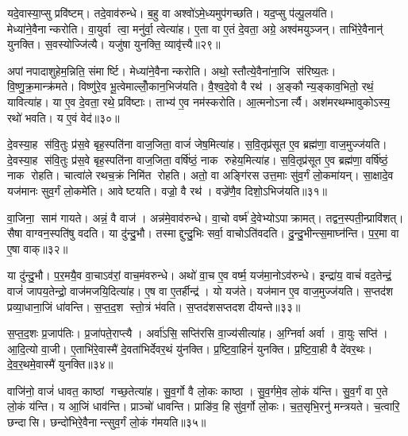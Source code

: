 यदे॒वास्या॒प्सु प्रवि॑ष्टम्। तदे॒वाव॑रुन्धे। ब॒हु वा अश्वो॑ऽमे॒ध्यमुप॑गच्छति। यद॒प्सु प॑ल्पू॒लय॑ति। मेध्या॑ने॒वै\-नान्करोति। वा॒युर्वा त्वा॒ मनु॑र्वा॒ त्वेत्या॑ह। ए॒ता वा ए॒तं दे॒वता॒ अग्रे॒ अश्व॑मयुञ्जन्। ताभि॑रे॒वैनान्॑ युनक्ति। स॒वस्योज्जि॑त्यै। यजु॑षा युनक्ति॒ व्यावृ॑त्त्यै॥२९॥

अपांनपादाशुहेम॒न्निति॒ संमार्ष्टि। मेध्या॑ने॒वैनान्करोति। अथो॒ स्तौत्ये॒वैना॑ना॒जि स॑रिष्य॒तः। वि॒ष्णु॒क्र॒मान्क्र॑मते। विष्णु॑रे॒व भू॒त्वेमाल्लोँ॒कान॒भिज॑यति। वै॒श्व॒दे॒वो वै रथ॑। अ॒ङ्कौ न्य॒ङ्काव॒भितो॒ रथं॒ यावित्या॑ह। या ए॒व दे॒वता॒ रथे॒ प्रवि॑ष्टाः। ताभ्य॑ ए॒व नम॑स्करोति। आ॒त्मनोऽनार्त्यै। अश॑मरथम्भावुकोऽस्य॒ रथो॑ भवति। य ए॒वं वेद॑॥३०॥\anuvakamend[स्व॒द॒य॒ति॒ प॒ल्पू॒लय॑ति॒ व्यावृ॑त्त्या॒ अनार्त्यै॒ द्वे च॑]

दे॒वस्या॒ह स॑वि॒तुः प्र॑स॒वे बृह॒स्पति॑ना वाज॒जिता॒ वाजं॑ जेष॒मित्या॑ह। स॒वि॒तृप्र॑सूत ए॒व ब्रह्म॑णा॒ वाज॒मुज्ज॑यति। दे॒वस्या॒ह स॑वि॒तुः प्र॑स॒वे बृह॒स्पति॑ना वाज॒जिता॒ वर्\mbox{}षि॑ष्ठं॒ नाक रुहेय॒मित्या॑ह। स॒वि॒तृप्र॑सूत ए॒व ब्रह्म॑णा॒ वर्\mbox{}षि॑ष्ठं॒ नाक रोहति। चात्वा॑ले रथच॒क्रं निमि॑त रोहति। अतो॒ वा अङ्गि॑रस उत्त॒माः सु॑व॒र्गं लो॒कमा॑यन्। सा॒क्षादे॒व यज॑मानः सुव॒र्गं लो॒कमे॑ति। आवेष्टयति। वज्रो॒ वै रथ॑। वज्रे॑णै॒व दिशो॒ऽभिज॑यति॥३१॥

वा॒जिना॒ साम॑ गायते। अन्नं॒ वै वाज॑। अन्न॑मे॒वाव॑रुन्धे। वा॒चो वर्ष्म॑ दे॒वेभ्योऽपाक्रामत्। तद्वन॒स्पती॒न्प्रावि॑शत्। सैषा वाग्वन॒स्पति॑षु वदति। या दु॑न्दु॒भौ। तस्माद्दुन्दु॒भिः सर्वा॒ वाचोऽति॑वदति। दु॒न्दु॒भीन्त्स॒माघ्न॑न्ति। प॒र॒मा वा ए॒षा वाक्॥३२॥

या दु॑न्दु॒भौ। प॒र॒मयै॒व वा॒चाऽव॑रां॒ वाच॒म॑वरुन्धे। अथो॑ वा॒च ए॒व वर्ष्म॒ यज॑मा॒नोऽव॑रुन्धे। इन्द्रा॑य॒ वाचं॑ वद॒तेन्द्रं॒ वाजं॑ जापय॒तेन्द्रो॒ वाज॑मजयि॒दित्या॑ह। ए॒ष वा ए॒तर्\mbox{}हीन्द्र॑। यो यज॑ते। यज॑मान ए॒व वाज॒मुज्ज॑यति। स॒प्तद॑श प्रव्या॒धाना॒जिं धा॑वन्ति। स॒प्त॒द॒श स्तो॒त्रं भ॑वति। स॒प्तद॑शसप्तदश दीयन्ते॥३३॥

स॒प्त॒द॒शः प्र॒जाप॑तिः। प्र॒जा॑पते॒राप्त्यै। अर्वा॑ऽसि॒ सप्ति॑रसि वा॒ज्य॑सीत्या॑ह। अ॒ग्निर्वा अर्वा। वा॒युः सप्ति॑। आ॒दि॒त्यो वा॒जी। ए॒ताभि॑रे॒वास्मै॑ दे॒वता॑भिर्देवर॒थं यु॑नक्ति। प्र॒ष्टि॒वा॒हिनं॑ युनक्ति। प्र॒ष्टि॒वा॒ही वै दे॑वर॒थः। दे॒व॒र॒थमे॒वास्मै॑ युनक्ति॥३४॥

वाजि॑नो॒ वाजं॑ धावत॒ काष्ठां गच्छ॒तेत्या॑ह। सु॒व॒र्गो वै लो॒कः काष्ठा। सु॒व॒र्गमे॒व लो॒कं य॑न्ति। सु॒व॒र्गं वा ए॒ते लो॒कं य॑न्ति। य आ॒जिं धाव॑न्ति। प्राञ्चो॑ धावन्ति। प्राङि॑व॒ हि सु॑व॒र्गो लो॒कः। च॒त॒सृभि॒रनु॑ मन्त्रयते। च॒त्वारि॒ छन्दासि। छन्दो॑भिरे॒वैनान्त्सुव॒र्गं लो॒कं ग॑मयति॥३५॥

